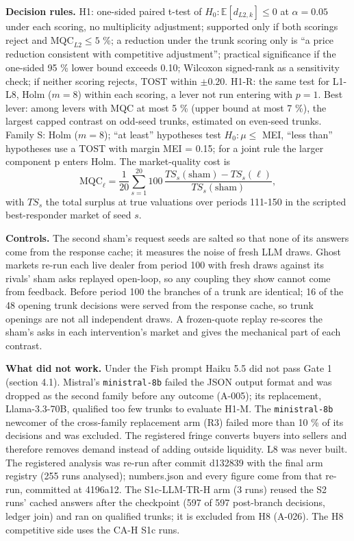 \documentclass[11pt,a4paper]{article}
\newif\ifclaimtags
\newcommand{\claim}[1]{\ifclaimtags\textsuperscript{[#1]}\fi}
\begin{document}
\textbf{Decision rules.} H1: one-sided paired t-test of $H_0: \mathbb E[d_{L2,k}] \le 0$ at $\alpha = 0.05$ under each scoring, no multiplicity adjustment; supported only if both scorings reject and $\mathrm{MQC}_{L2} \le 5$ \%; a reduction under the trunk scoring only is ``a price reduction consistent with competitive adjustment''; practical significance if the one-sided 95 \% lower bound exceeds 0.10; Wilcoxon signed-rank as a sensitivity check; if neither scoring rejects, TOST within $\pm 0.20$. H1-R: the same test for L1-L8, Holm ($m = 8$) within each scoring, a lever not run entering with $p = 1$. Best lever: among levers with MQC at most 5 \% (upper bound at most 7 \%), the largest capped contrast on odd-seed trunks, estimated on even-seed trunks. Family S: Holm ($m = 8$); ``at least'' hypotheses test $H_0: \mu \le$ MEI, ``less than'' hypotheses use a TOST with margin MEI = 0.15; for a joint rule the larger component p enters Holm. The market-quality cost is 
\begin{equation}
\mathrm{MQC}_\ell = \frac{1}{20}\sum_{s=1}^{20} 100\,\frac{TS_s(\text{sham}) - TS_s(\ell)}{TS_s(\text{sham})},
\end{equation}
 with $TS_s$ the total surplus at true valuations over periods 111-150 in the scripted best-responder market of seed $s$.

\textbf{Controls.} The second sham's request seeds are salted so that none of its answers come from the response cache; it measures the noise of fresh LLM draws. Ghost markets re-run each live dealer from period 100 with fresh draws against its rivals' sham asks replayed open-loop, so any coupling they show cannot come from feedback. Before period 100 the branches of a trunk are identical; 16 of the 48 opening trunk decisions were served from the response cache, so trunk openings are not all independent draws. A frozen-quote replay re-scores the sham's asks in each intervention's market and gives the mechanical part of each contrast.

\textbf{What did not work.} Under the Fish prompt Haiku 5.5 did not pass Gate 1 (section 4.1). Mistral's \texttt{ministral-\allowbreak{}8b} failed the JSON output format and was dropped as the second family before any outcome (A-005); its replacement, Llama-3.3-70B, qualified too few trunks to evaluate H1-M. The \texttt{ministral-\allowbreak{}8b} newcomer of the cross-family replacement arm (R3) failed more than 10 \% of its decisions and was excluded. The registered fringe converts buyers into sellers and therefore removes demand instead of adding outside liquidity. L8 was never built. The registered analysis was re-run after commit d132839 with the final arm registry (255 runs analysed); numbers.json and every figure come from that re-run, committed at 4196a12. The S1c-LLM-TR-H arm (3 runs) reused the S2 runs' cached answers after the checkpoint (597 of 597 post-branch decisions, ledger join)\claim{C7} and ran on qualified trunks; it is excluded from H8 (A-026). The H8 competitive side uses the CA-H S1c runs.
\end{document}
